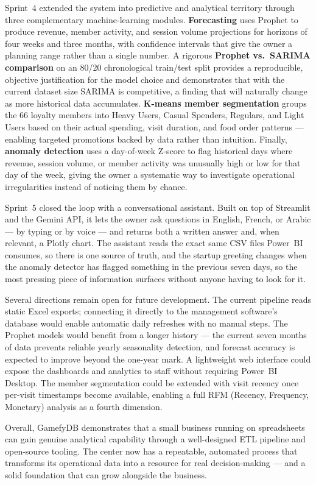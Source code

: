 Sprint~4 extended the system into predictive and analytical territory through three
complementary machine-learning modules. \textbf{Forecasting} uses Prophet to produce
revenue, member activity, and session volume projections for horizons of four weeks and
three months, with confidence intervals that give the owner a planning range rather than
a single number. A rigorous \textbf{Prophet vs.\ SARIMA comparison} on an 80/20
chronological train/test split provides a reproducible, objective justification for the
model choice and demonstrates that with the current dataset size SARIMA is competitive,
a finding that will naturally change as more historical data accumulates. \textbf{K-means
member segmentation} groups the 66 loyalty members into Heavy Users, Casual Spenders,
Regulars, and Light Users based on their actual spending, visit duration, and food order
patterns --- enabling targeted promotions backed by data rather than intuition.
Finally, \textbf{anomaly detection} uses a day-of-week Z-score to flag historical
days where revenue, session volume, or member activity was unusually high or low for
that day of the week, giving the owner a systematic way to investigate operational
irregularities instead of noticing them by chance.

Sprint~5 closed the loop with a conversational assistant. Built on top of Streamlit
and the Gemini API, it lets the owner ask questions in English, French, or Arabic ---
by typing or by voice --- and returns both a written answer and, when relevant, a
Plotly chart. The assistant reads the exact same CSV files Power~BI consumes, so
there is one source of truth, and the startup greeting changes when the anomaly
detector has flagged something in the previous seven days, so the most pressing
piece of information surfaces without anyone having to look for it.

Several directions remain open for future development. The current pipeline reads
static Excel exports; connecting it directly to the management software's database
would enable automatic daily refreshes with no manual steps. The Prophet models would
benefit from a longer history --- the current seven months of data prevents reliable
yearly seasonality detection, and forecast accuracy is expected to improve beyond the
one-year mark. A lightweight web interface could expose the dashboards and analytics
to staff without requiring Power~BI Desktop. The member segmentation could be extended
with visit recency once per-visit timestamps become available, enabling a full RFM
(Recency, Frequency, Monetary) analysis as a fourth dimension.

Overall, GamefyDB demonstrates that a small business running on spreadsheets can gain
genuine analytical capability through a well-designed ETL pipeline and open-source
tooling. The center now has a repeatable, automated process that transforms its
operational data into a resource for real decision-making --- and a solid foundation
that can grow alongside the business.

